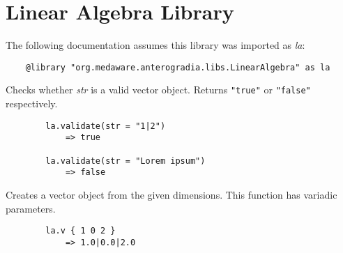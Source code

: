 \section{Linear Algebra Library}
\vspace{1.5mm}
The following documentation assumes this library was imported as \textit{la}:
\begin{verbatim}
	@library "org.medaware.anterogradia.libs.LinearAlgebra" as la
\end{verbatim}
\begin{multicols*}{2}
	Checks whether \textit{str} is a valid vector object.
	Returns \verb|"true"| or \verb|"false"| respectively.
	\begin{verbatim}
		la.validate(str = "1|2")
		    => true

		la.validate(str = "Lorem ipsum")
		    => false
	\end{verbatim}
	Creates a vector object from the given dimensions.
	This function has variadic parameters.
	\begin{verbatim}
		la.v { 1 0 2 }
		    => 1.0|0.0|2.0


\end{verbatim}
\end{multicols*}
